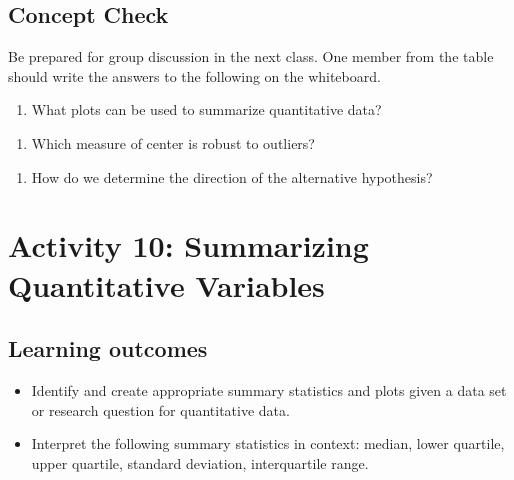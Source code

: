 \documentclass[
]{report}
\providecommand{\tightlist}{%
  \setlength{\itemsep}{0pt}\setlength{\parskip}{0pt}}
\begin{document}
\vspace{0.8in}

\subsection{Concept Check}\label{concept-check-4}

Be prepared for group discussion in the next class. One member from the table should write the answers to the following on the whiteboard.

\begin{enumerate}
\def\labelenumi{\arabic{enumi}.}
\tightlist
\item
  What plots can be used to summarize quantitative data?
\end{enumerate}

\vspace{0.7in}

\begin{enumerate}
\def\labelenumi{\arabic{enumi}.}
\setcounter{enumi}{1}
\tightlist
\item
  Which measure of center is robust to outliers?
\end{enumerate}

\vspace{0.2in}

\begin{enumerate}
\def\labelenumi{\arabic{enumi}.}
\setcounter{enumi}{2}
\tightlist
\item
  How do we determine the direction of the alternative hypothesis?
\end{enumerate}

\newpage

\section{Activity 10: Summarizing Quantitative Variables}\label{activity-10-summarizing-quantitative-variables}


\subsection{Learning outcomes}\label{learning-outcomes-10}

\begin{itemize}
\item
  Identify and create appropriate summary statistics and plots given a data set or research question for quantitative data.
\item
  Interpret the following summary statistics in context:
  median, lower quartile, upper quartile,
  standard deviation, interquartile range.
\end{itemize}
\end{document}
